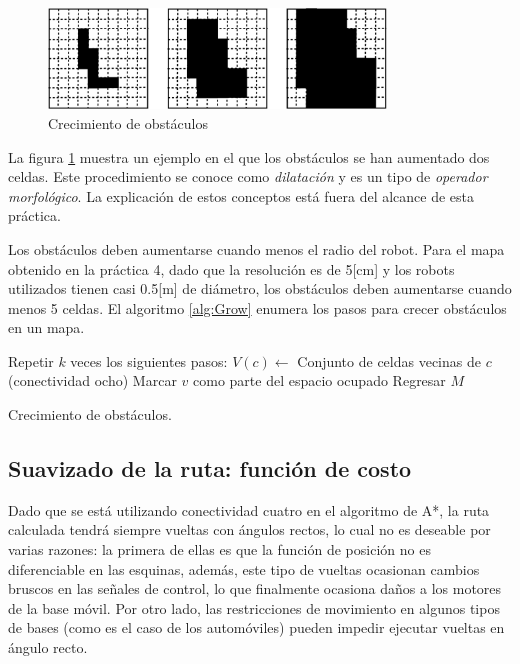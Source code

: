 \documentclass[letterpaper,12pt]{article}
\begin{document}
\begin{figure}
\centering
\includegraphics[width=0.8\textwidth]{Figures/Grow.eps}
\caption{Crecimiento de obstáculos}
\label{fig:Grow}
\end{figure}

La figura \ref{fig:Grow} muestra un ejemplo en el que los obstáculos se han aumentado dos celdas. Este procedimiento se conoce como \textit{dilatación} y es un tipo de \textit{operador morfológico}. La explicación de estos conceptos está fuera del alcance de esta práctica.

Los obstáculos deben aumentarse cuando menos el radio del robot. Para el mapa obtenido en la práctica 4, dado que la resolución es de 5[cm] y los robots utilizados tienen casi 0.5[m] de diámetro, los obstáculos deben aumentarse cuando menos 5 celdas. El algoritmo \ref{alg:Grow} enumera los pasos para crecer obstáculos en un mapa.

\begin{algorithm}
\DontPrintSemicolon
{}
Repetir $k$ veces los siguientes pasos:\;
{
  {
    $V(c) \leftarrow $ Conjunto de celdas vecinas de $c$ (conectividad ocho)\;
    {
      Marcar $v$ como parte del espacio ocupado\;
    }
  }
}
Regresar $M$
\caption{Crecimiento de obstáculos.}
\label{alg:Grow}
\end{algorithm}


\subsection{Suavizado de la ruta: función de costo}
Dado que se está utilizando conectividad cuatro en el algoritmo de A*, la ruta calculada tendrá siempre vueltas con ángulos rectos, lo cual no es deseable por varias razones: la primera de ellas es que la función de posición no es diferenciable en las esquinas, además, este tipo de vueltas ocasionan cambios bruscos en las señales de control, lo que finalmente ocasiona daños a los motores de la base móvil. Por otro lado, las restricciones de movimiento en algunos tipos de bases (como es el caso de los automóviles) pueden impedir ejecutar vueltas en ángulo recto.
\end{document}
